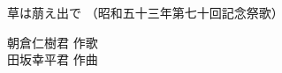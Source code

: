 \documentclass[10pt,b5j]{tarticle} %
\begin{document}
\begin{minipage}[c]{0.7\hsize} %
    \begin{center}
        {\LARGE
            草は萠え出で %
        }
        {\small 
            （昭和五十三年第七十回記念祭歌） %
        }
    \end{center}
\end{minipage}
\begin{minipage}[c]{0.3\hsize} %
    \begin{flushright} %
        朝倉仁樹君 作歌\\田坂幸平君 作曲 %
    \end{flushright}
\end{minipage}
\end{document}
